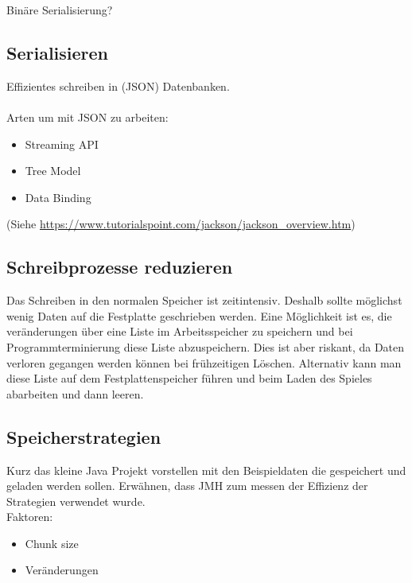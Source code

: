 Binäre Serialisierung?

\subsection{Serialisieren}
Effizientes schreiben in (JSON) Datenbanken.\\\\
Arten um mit JSON zu arbeiten:
\begin{itemize}
    \item Streaming API
    \item Tree Model
    \item Data Binding
\end{itemize}
(Siehe \url{https://www.tutorialspoint.com/jackson/jackson_overview.htm})


\subsection{Schreibprozesse reduzieren}
Das Schreiben in den normalen Speicher ist zeitintensiv. Deshalb sollte möglichst wenig Daten auf die Festplatte geschrieben werden. Eine Möglichkeit ist es, die veränderungen über eine Liste im Arbeitsspeicher zu speichern und bei Programmterminierung diese Liste abzuspeichern. Dies ist aber riskant, da Daten verloren gegangen werden können bei frühzeitigen Löschen. Alternativ kann man diese Liste auf dem Festplattenspeicher führen und beim Laden des Spieles abarbeiten und dann leeren.



\subsection{Speicherstrategien}
Kurz das kleine Java Projekt vorstellen mit den Beispieldaten die gespeichert und geladen werden sollen. Erwähnen, dass JMH zum messen der Effizienz der Strategien verwendet wurde.\\

Faktoren:\\
\begin{itemize}
    \item Chunk size
    \item Veränderungen
\end{itemize}




